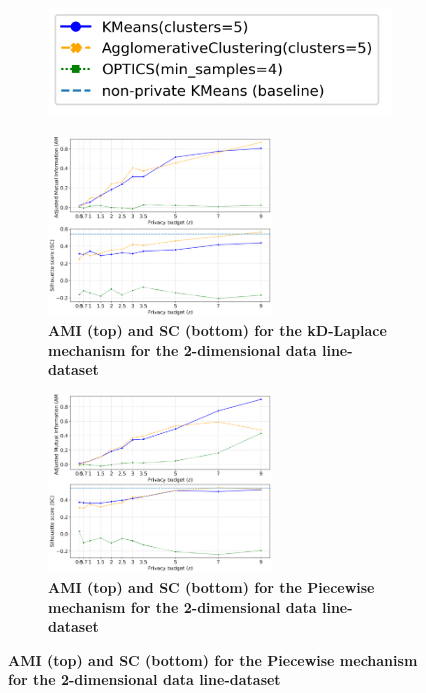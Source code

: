 \newpage
\begin{figure}[H]
    \centering
    \begin{subfigure}{0.3\textwidth}
        \includegraphics[width=\textwidth]{Results/kd-laplace/kd-Laplace/circle-dataset/legend_2.png}
    \end{subfigure}
    \begin{subfigure}{1\textwidth}
        \centering
        \caption{\textbf{AMI (top) and SC (bottom) for the kD-Laplace mechanism for the 2-dimensional data line-dataset}}
        \includegraphics[width=0.65\textwidth]{Results/kd-laplace/kd-Laplace/line-dataset/ami-and-sc_2_dimensions.png}
        \centering
    \end{subfigure}
    \begin{subfigure}{1\textwidth}
        \centering
        \caption{\textbf{AMI (top) and SC (bottom) for the Piecewise mechanism for the 2-dimensional data line-dataset}}
        \includegraphics[width=0.65\textwidth]{Results/kd-laplace/piecewise/line-dataset/ami-and-sc_2_dimensions.png}
    \end{subfigure}
    \label{fig:validation-line-dataset_comparison_2d-laplace}
\end{figure}

